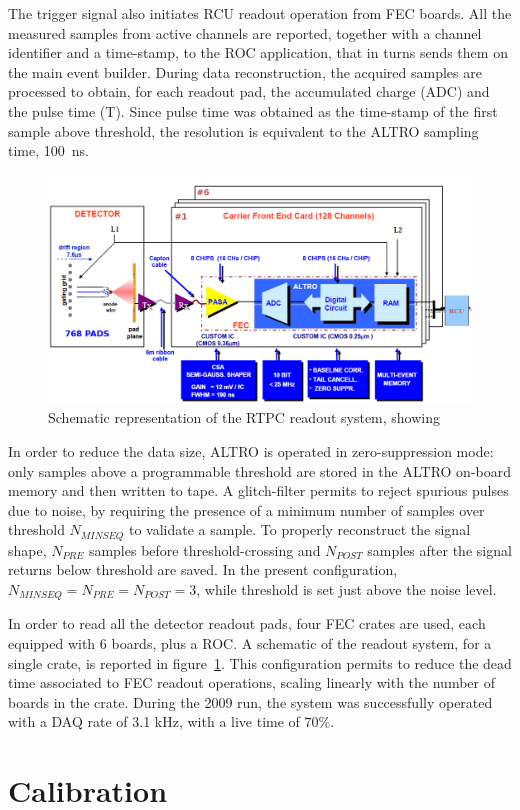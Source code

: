 \documentclass[twocolumn,showpacs,superscriptaddress,groupedaddress]{revtex4}
\begin{document}
The trigger signal also initiates RCU readout operation from FEC boards. All 
the measured samples from active channels are reported, together with a channel 
identifier and a time-stamp, to the ROC application, that in turns sends them 
on the main event builder. During data reconstruction, the acquired samples are 
processed to obtain, for each readout pad, the accumulated charge (ADC) and the 
pulse time (T). Since pulse time was obtained as the time-stamp of the first 
sample above threshold, the resolution is equivalent to the ALTRO sampling 
time, 100~ns.

\begin{figure}[tb]
   \centering
   \includegraphics[width=.45\textwidth]{fig/ReadoutScheme.png}
   \caption[]{Schematic representation of the RTPC readout system, showing} 
   \label{fig:ReadoutScheme}
\end{figure}

In order to reduce the data size, ALTRO is operated in zero-suppression mode: 
only samples above a programmable threshold are stored in the ALTRO on-board 
memory and then written to tape. A glitch-filter permits to reject spurious 
pulses due to noise, by requiring the presence of a minimum number of samples 
over threshold $N_{MINSEQ}$ to validate a sample. To properly reconstruct 
the signal shape, $N_{PRE}$ samples before threshold-crossing and $N_{POST}$ 
samples after the signal returns below threshold are saved. In the present 
configuration, $N_{MINSEQ}=N_{PRE}=N_{POST}=3$, while threshold is set just 
above the noise level. 

In order to read all the detector readout pads, four FEC crates are used, 
each equipped with 6 boards, plus a ROC. A schematic of the readout system, 
for a single crate, is reported in figure~\ref{fig:ReadoutScheme}. This 
configuration permits to reduce the dead time associated to FEC readout 
operations, scaling linearly with the number of boards in the crate. During 
the 2009 run, the system was successfully operated with a DAQ rate of 3.1 kHz, 
with a live time of $70 \%$.

\section{Calibration} \label{sec_calib}
\end{document}
